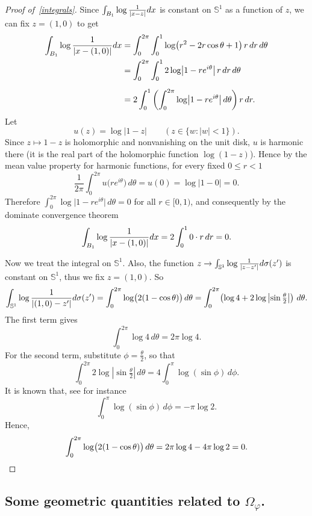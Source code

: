 \documentclass[10pt,reqno,english]{amsart}
\theoremstyle{definition}
\numberwithin{equation}{section}
\begin{document}
\begin{proof}[Proof of~\eqref{integrals}]
Since  $\int_{B_1} \log {1\over |x-z|} dx $ is constant on $\mathbb{S}^1$ as a function of $z$, we can fix $z=(1,0)$ to get
\[
\begin{aligned}
\int_{B_1} \log {1\over |x-(1,0)|} dx  &= \int_{0}^{2\pi}\int_{0}^{1} \log\!\big(r^{2}-2r\cos\theta+1\big)\,r\,dr\,d\theta\\
&= \int_{0}^{2\pi}\int_{0}^{1} 2\log\!\big|1-re^{i\theta}\big|\,r\,dr\,d\theta \\[6pt]
  &= 2\int_{0}^{1}\left(\int_{0}^{2\pi}\log\!\big|1-re^{i\theta}\big|\,d\theta\right) r\,dr.
\end{aligned}
\]
Let
\[
u(z)=\log|1-z|\qquad (z\in\{w:|w|<1\}).
\]
Since $z\mapsto 1-z$ is holomorphic and nonvanishing on the unit disk, $u$ is harmonic there (it is the real part of the holomorphic function $\log(1-z)$). Hence by the mean value property for harmonic functions, for every fixed $0\le r<1$
\[
\frac{1}{2\pi}\int_{0}^{2\pi} u\big(re^{i\theta}\big)\,d\theta = u(0)=\log|1-0|=0.
\]
Therefore $\displaystyle\int_{0}^{2\pi}\log\!\big|1-re^{i\theta}\big|\,d\theta=0$ for all $r\in[0,1)$, and consequently by the dominate convergence theorem
\[
\int_{B_1} \log {1\over |x-(1,0)|} dx =2\int_{0}^{1}0\cdot r\,dr=0.
\]


\medskip
Now we treat the integral on $\mathbb{S}^1$.
Also, the function $z \to \int_{\mathbb{S}^1} \log {1\over |z-z'|} d\sigma (z') $ is constant on $\mathbb{S}^1$, thus we fix $z=(1,0)$. So 
    \[
\int_{\mathbb{S}^1} \log {1\over |(1,0)-z'|} d\sigma (z') =\int_{0}^{2\pi} \log \bigl(2(1-\cos \theta)\bigr)\, d\theta
= \int_{0}^{2\pi}\! \left(\log 4 + 2 \log \left|\sin \tfrac{\theta}{2}\right|\right)\, d\theta.
\]
The first term gives
\[
\int_{0}^{2\pi} \log 4 \, d\theta = 2\pi \log 4.
\]
For the second term, substitute $\phi = \tfrac{\theta}{2}$, so that
\[
\int_{0}^{2\pi} 2 \log \left|\sin \tfrac{\theta}{2}\right|\, d\theta
= 4 \int_{0}^{\pi} \log(\sin \phi)\, d\phi.
\]
It is known that, see for instance~\cite[Formula 4.484.3 page 582]{GRbook}
\[
\int_{0}^{\pi} \log(\sin \phi)\, d\phi = -\pi \log 2.
\]
Hence,
\[
\int_{0}^{2\pi} \log \bigl(2(1-\cos \theta)\bigr)\, d\theta
= 2\pi \log 4 - 4\pi \log 2
= 0.\qedhere
\]
\end{proof}



\subsection{Some geometric quantities related to \texorpdfstring{$\Omega_\varphi$}{Omega phi}.}
\label{app:per}
\end{document}
